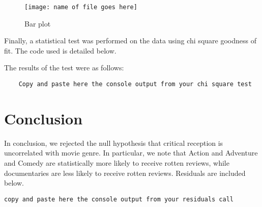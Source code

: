 \documentclass[12pt,a4paper]{article}
\begin{document}
\begin{figure}[h!]\centering
	\caption{\footnotesize Bar plot}
	\texttt{[image: name of file goes here]}
\end{figure} 

Finally, a statistical test was performed on the data using chi square goodness of fit. The code used is detailed below.



The results of the test were as follows:

\begin{verbatim}
	Copy and paste here the console output from your chi square test
\end{verbatim}

\section*{Conclusion}

In conclusion, we rejected the null hypothesis that critical reception is uncorrelated with movie genre. In particular, we note that Action and Adventure and Comedy are statistically more likely to receive rotten reviews, while documentaries are less likely to receive rotten reviews. Residuals are included below.

\begin{verbatim}
copy and paste here the console output from your residuals call
\end{verbatim}
\end{document}
